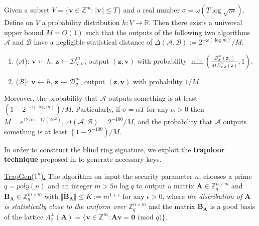 \documentclass[runningheads]{llncs}
\begin{document}
\fi

\begin{lemma}
	\label{lem3}
	Given a subset $V=\{\mathbf{v}\in \mathbb{Z}^m: \Vert \mathbf{v} \Vert \leq T \}$ and a real number $\sigma=\omega(T\log\sqrt{m})$. Define on $V$ a probability distribution $h:V \rightarrow \mathbb{R}$. Then there exists a universal upper bound $M=O(1)$ such that the outputs of the following two algorithms $\mathcal{A}$ and $\mathcal{B}$ have a negligible statistical distance of  $\Delta(\mathcal{A}, \mathcal{B}):=2^{-\omega(\log m)}/M$:
	\begin{enumerate}
		\item ($\mathcal{A}$): $\mathbf{v} \leftarrow h$, $\mathbf{z} \leftarrow \mathcal{D}_{\mathbf{v},\sigma} ^m$, output $(\mathbf{z}, \mathbf{v} )$ with probability $\min(\frac{\mathcal{D}_{\sigma} ^m(\mathbf{z},)}{M\mathcal{D}_{\mathbf{v},\sigma} ^m(\mathbf{z})},1)$.
		\item ($\mathcal{B}$): $\mathbf{v} \leftarrow h$, $\mathbf{z} \leftarrow \mathcal{D}_{\sigma}^m $, output $(\mathbf{z}, \mathbf{v} )$ with probability $1/M$.
	\end{enumerate}
	Moreover, the probability that $\mathcal{A}$ outputs something is at least $(1-2^{-\omega(\log m)})/M$. Particularly, if $\sigma=\alpha T$ for any $\alpha >0$ then $M=e^{12/\alpha+1/(2\alpha^2)}$,  $\Delta(\mathcal{A}, \mathcal{B})=2^{-100}/M$, and the probability that $\mathcal{A}$ outputs something is at least $(1-2^{-100})/M$.
\end{lemma}



In order to construct the blind ring signature, we exploit the \textbf{trapdoor technique} proposed in \cite[Subsection 5.3]{GPV08} to generate necessary keys. 

\underline{    \textsf{TrapGen($1^n $)}.} The algorithm on input the security parameter $n$, chooses a prime $q=poly(n)$ and an integer $m>5n\log q$ to output a matrix $\mathbf{A}\in \mathbb{Z}_q^{n \times m}$ and $\mathbf{B}_{\mathbf{A}}\in \mathbb{Z}_q^{m \times m}$ with $\Vert \tilde{\mathbf{B}}_{\mathbf{A}}\Vert\leq  K:=m^{1+\epsilon}$ for any $\epsilon >0$, where \textit{the distribution of $\mathbf{A}$ is statistically close to the uniform over $\mathbb{Z}_q^{n\times m} $} and the matrix $\mathbf{B}_{\mathbf{A}}$ is a good basis of the lattice 
$\Lambda_q^{\bot}(\mathbf{A})=\{ \mathbf{v} \in \mathbb{Z}^m: \mathbf{A}\mathbf{v}=\mathbf{0} \text{ (mod } q) \}$.
\end{document}
